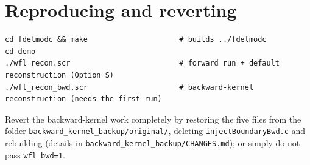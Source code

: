 \documentclass[11pt,a4paper]{article}
\begin{document}
\section{Reproducing and reverting}
\begin{lstlisting}
cd fdelmodc && make                     # builds ../fdelmodc
cd demo
./wfl_recon.scr                         # forward run + default reconstruction (Option S)
./wfl_recon_bwd.scr                     # backward-kernel reconstruction (needs the first run)
\end{lstlisting}
\begin{sloppypar}
Revert the backward-kernel work completely by restoring the five files from
the folder \texttt{backward\_kernel\_backup/original/}, deleting
\texttt{injectBoundaryBwd.c} and rebuilding (details in
\texttt{backward\_kernel\_backup/CHANGES.md}); or simply do not pass
\texttt{wfl\_bwd=1}.
\end{sloppypar}
\end{document}
